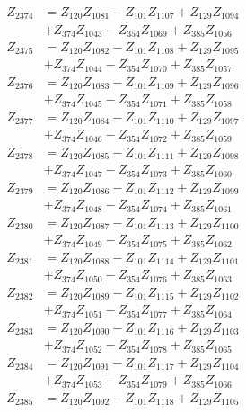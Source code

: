 \begin{multicols}{2}
\begin{align}
Z_{2374} &= Z_{120}Z_{1081} - Z_{101}Z_{1107} + Z_{129}Z_{1094}  \nonumber \\
&+ Z_{374}Z_{1043} - Z_{354}Z_{1069} + Z_{385}Z_{1056} \nonumber \\
Z_{2375} &= Z_{120}Z_{1082} - Z_{101}Z_{1108} + Z_{129}Z_{1095}  \nonumber \\
&+ Z_{374}Z_{1044} - Z_{354}Z_{1070} + Z_{385}Z_{1057} \nonumber \\
Z_{2376} &= Z_{120}Z_{1083} - Z_{101}Z_{1109} + Z_{129}Z_{1096}  \nonumber \\
&+ Z_{374}Z_{1045} - Z_{354}Z_{1071} + Z_{385}Z_{1058} \nonumber \\
Z_{2377} &= Z_{120}Z_{1084} - Z_{101}Z_{1110} + Z_{129}Z_{1097}  \nonumber \\
&+ Z_{374}Z_{1046} - Z_{354}Z_{1072} + Z_{385}Z_{1059} \nonumber \\
Z_{2378} &= Z_{120}Z_{1085} - Z_{101}Z_{1111} + Z_{129}Z_{1098}  \nonumber \\
&+ Z_{374}Z_{1047} - Z_{354}Z_{1073} + Z_{385}Z_{1060} \nonumber \\
Z_{2379} &= Z_{120}Z_{1086} - Z_{101}Z_{1112} + Z_{129}Z_{1099}  \nonumber \\
&+ Z_{374}Z_{1048} - Z_{354}Z_{1074} + Z_{385}Z_{1061} \nonumber \\
Z_{2380} &= Z_{120}Z_{1087} - Z_{101}Z_{1113} + Z_{129}Z_{1100}  \nonumber \\
&+ Z_{374}Z_{1049} - Z_{354}Z_{1075} + Z_{385}Z_{1062} \nonumber \\
Z_{2381} &= Z_{120}Z_{1088} - Z_{101}Z_{1114} + Z_{129}Z_{1101}  \nonumber \\
&+ Z_{374}Z_{1050} - Z_{354}Z_{1076} + Z_{385}Z_{1063} \nonumber \\
Z_{2382} &= Z_{120}Z_{1089} - Z_{101}Z_{1115} + Z_{129}Z_{1102}  \nonumber \\
&+ Z_{374}Z_{1051} - Z_{354}Z_{1077} + Z_{385}Z_{1064} \nonumber \\
Z_{2383} &= Z_{120}Z_{1090} - Z_{101}Z_{1116} + Z_{129}Z_{1103}  \nonumber \\
&+ Z_{374}Z_{1052} - Z_{354}Z_{1078} + Z_{385}Z_{1065} \nonumber \\
Z_{2384} &= Z_{120}Z_{1091} - Z_{101}Z_{1117} + Z_{129}Z_{1104}  \nonumber \\
&+ Z_{374}Z_{1053} - Z_{354}Z_{1079} + Z_{385}Z_{1066} \nonumber \\
Z_{2385} &= Z_{120}Z_{1092} - Z_{101}Z_{1118} + Z_{129}Z_{1105}  \nonumber \\

\end{align}
\end{multicols}
